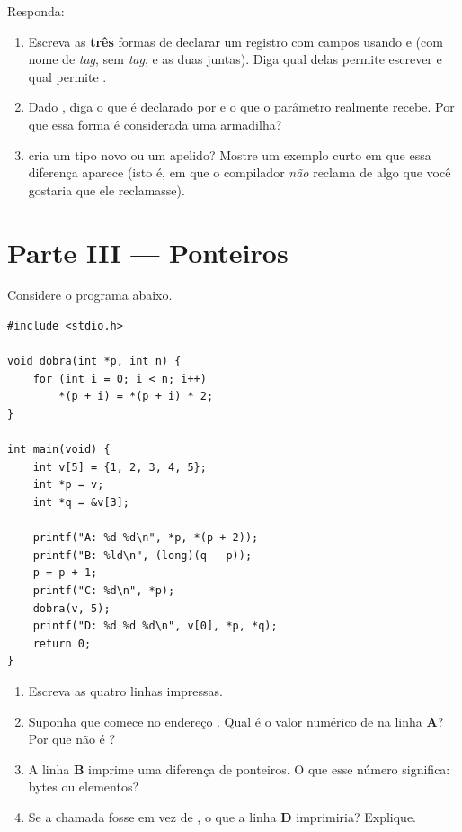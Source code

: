 \documentclass[11pt,a4paper]{article}
\begin{document}
Responda:

\begin{enumerate}[label=(\alph*),leftmargin=1.8em,itemsep=1pt]
  \item Escreva as \textbf{três} formas de declarar um registro  com campos
         usando  e  (com nome de \emph{tag},
        sem \emph{tag}, e as duas juntas). Diga qual delas permite escrever
         e qual permite .
  \item Dado , diga o que é declarado por
         e o que o parâmetro  realmente recebe.
        Por que essa forma é considerada uma armadilha?
  \item {} cria um tipo novo ou um apelido? Mostre um exemplo curto em que
        essa diferença aparece (isto é, em que o compilador \emph{não} reclama de
        algo que você gostaria que ele reclamasse).
\end{enumerate}

\section{Parte III --- Ponteiros}

Considere o programa abaixo.

\begin{lstlisting}
#include <stdio.h>

void dobra(int *p, int n) {
    for (int i = 0; i < n; i++)
        *(p + i) = *(p + i) * 2;
}

int main(void) {
    int v[5] = {1, 2, 3, 4, 5};
    int *p = v;
    int *q = &v[3];

    printf("A: %d %d\n", *p, *(p + 2));
    printf("B: %ld\n", (long)(q - p));
    p = p + 1;
    printf("C: %d\n", *p);
    dobra(v, 5);
    printf("D: %d %d %d\n", v[0], *p, *q);
    return 0;
}
\end{lstlisting}

\begin{enumerate}[label=(\alph*),leftmargin=1.8em,itemsep=1pt]
  \item Escreva as quatro linhas impressas.
  \item Suponha que  comece no endereço . Qual é o valor numérico de
         na linha \textbf{A}? Por que não é ?
  \item A linha \textbf{B} imprime uma diferença de ponteiros. O que esse número
        significa: bytes ou elementos?
  \item Se a chamada fosse  em vez de , o que a linha
        \textbf{D} imprimiria? Explique.
\end{enumerate}
\end{document}

